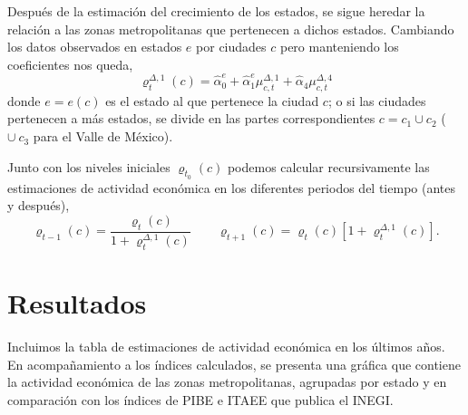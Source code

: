 \documentclass[]{article}
\begin{document}
Después de la estimación del crecimiento de los estados, se sigue
heredar la relación a las zonas metropolitanas que pertenecen a dichos
estados. Cambiando los datos observados en estados \(e\) por ciudades
\(c\) pero manteniendo los coeficientes nos queda,
\[ \varrho_{t}^{\Delta,1}(c) = \hat\alpha_0^e + 
\hat\alpha_1^e\mu_{c,t}^{\Delta,1} + \hat\alpha_4\mu_{c,t}^{\Delta,4} \]
donde \(e = e(c)\) es el estado al que pertenece la ciudad \(c\); o si
las ciudades pertenecen a más estados, se divide en las partes
correspondientes \(c=c_1\cup c_2\) (\(\cup\ c_3\) para el Valle de
México).

Junto con los niveles iniciales \(\varrho_{t_0}(c)\) podemos calcular
recursivamente las estimaciones de actividad económica en los diferentes
periodos del tiempo (antes y después),
\[ \varrho_{t-1}(c) = \frac{\varrho_t(c)}{1 + \varrho_t^{\Delta,1}(c)}
      \qquad
      \varrho_{t+1}(c) = \varrho_t(c)[1 + \varrho_t^{\Delta,1}(c)].\]

\section{Resultados}\label{resultados}

Incluimos la tabla de estimaciones de actividad económica en los últimos
años. En acompañamiento a los índices calculados, se presenta una
gráfica que contiene la actividad económica de las zonas metropolitanas,
agrupadas por estado y en comparación con los índices de PIBE e ITAEE
que publica el INEGI.
\end{document}
